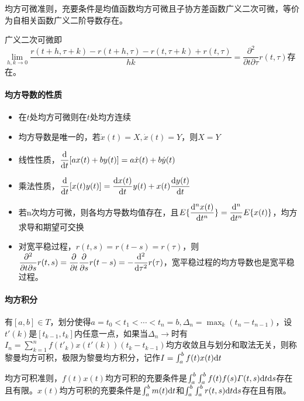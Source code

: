 \documentclass[11pt,a4paper]{ctexart}
\renewcommand{\d}{{\rm d}}
\begin{document}
            均方可微准则，充要条件是均值函数均方可微且子协方差函数广义二次可微，等价为自相关函数广义二阶导数存在。

            广义二次可微即$\lim\limits_{h,k\rightarrow0}\dfrac{r(t+h,\tau+k)-r(t+h,\tau)-r(t,\tau+k)+r(t,\tau)}{hk}=\dfrac{\partial^2}{\partial t\partial\tau}r(t,\tau)$存在。

            \paragraph{均方导数的性质}
            \begin{itemize}
                \item 在$t$处均方可微则在$t$处均方连续
                \item 均方导数是唯一的，若$\dot x(t)=X,\dot x(t)=Y$，则$X=Y$
                \item 线性性质，$\dfrac{\d}{\d t}[ax(t)+by(t)]=a\dot x(t)+b\dot y(t)$
                \item 乘法性质，$\dfrac{\d}{\d t}[x(t)y(t)]=\dfrac{\d x(t)}{\d t}y(t)+x(t)\dfrac{\d y(t)}{\d t}$
                \item 若n次均方可微，则各均方导数均值存在，且$E\{\dfrac{\d^nx(t)}{\d t^n}\}=\dfrac{\d^n}{\d t^n}E\{x(t)\}$，均方求导和期望可交换
                \item 对宽平稳过程，$r(t,s)=r(t-s)=r(\tau)$，则$\dfrac{\partial^2}{\partial t\partial s}r(t,s)=\dfrac{\partial}{\partial t}\dfrac{\partial}{\partial s}r(t-s)=-\dfrac{\d^2}{\d \tau^2}r(\tau)$，宽平稳过程的均方导数也是宽平稳过程。
            \end{itemize}

            \paragraph{均方积分}\leavevmode

            有$[a,b]\in T$，划分使得$a=t_0<t_1<\cdots<t_n=b,\Delta_n=\max_{k}(t_n-t_{n-1})$，设$t'(k)$是$[t_{k-1},t_k]$内任意一点，如果当$\Delta_n\rightarrow$时有$I_n=\sum\limits_{k=1}^{n}f(t'_k)x(t'(k))(t_k-t_{k-1})$均方收敛且与划分和取法无关，则称黎曼均方可积，极限为黎曼均方积分，记作$I=\int_a^bf(t)x(t)\d t$

            均方可积准则，$f(t)x(t)$均方可积的充要条件是$\int_a^b\int_a^bf(t)f(s)\varGamma(t,s)\d t\d s$存在且有限。$x(t)$均方可积的充要条件是$\int_a^bm(t)\d t$和$\int_a^b\int_a^br(t,s)\d t\d s$存在且有限。
\end{document}
